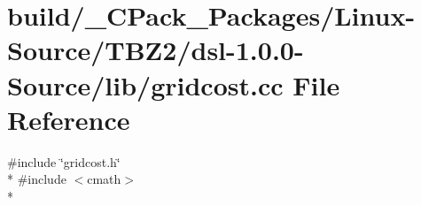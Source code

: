 \section{build/\-\_\-\-C\-Pack\-\_\-\-Packages/\-Linux-\/\-Source/\-T\-B\-Z2/dsl-\/1.0.0-\/\-Source/lib/gridcost.cc File Reference}
\label{build_2__CPack__Packages_2Linux-Source_2TBZ2_2dsl-1_80_80-Source_2lib_2gridcost_8cc}
{\ttfamily \#include \char`\"{}gridcost.\-h\char`\"{}}\\*
{\ttfamily \#include $<$cmath$>$}\\*
